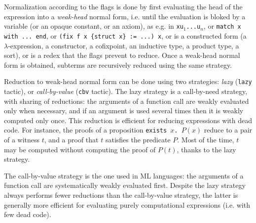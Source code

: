 Normalization according to the flags is done by first evaluating the
head of the expression into a {\em weak-head} normal form, i.e. until
the evaluation is bloked by a variable (or an opaque constant, or an
axiom), as e.g. in {\tt x\;u$_1$\;...\;u$_n$}, or {\tt match x with
  ... end}, or {\tt (fix f x \{struct x\} := ...) x}, or is a
constructed form (a $\lambda$-expression, a constructor, a cofixpoint,
an inductive type, a product type, a sort), or is a redex that the
flags prevent to reduce. Once a weak-head normal form is obtained,
subterms are recursively reduced using the same strategy.

Reduction to weak-head normal form can be done using two strategies:
{\em lazy} ({\tt lazy} tactic), or {\em call-by-value} ({\tt cbv}
tactic). The lazy strategy is a call-by-need strategy, with sharing of
reductions: the arguments of a function call are weakly evaluated only
when necessary, and if an argument is used several times then it is
weakly computed only once. This reduction is efficient for reducing
expressions with dead code. For instance, the proofs of a proposition
{\tt exists~$x$. $P(x)$} reduce to a pair of a witness $t$, and a
proof that $t$ satisfies the predicate $P$. Most of the time, $t$ may
be computed without computing the proof of $P(t)$, thanks to the lazy
strategy.

The call-by-value strategy is the one used in ML languages: the
arguments of a function call are systematically weakly evaluated
first. Despite the lazy strategy always performs fewer reductions than
the call-by-value strategy, the latter is generally more efficient for
evaluating purely computational expressions (i.e. with few dead code).

